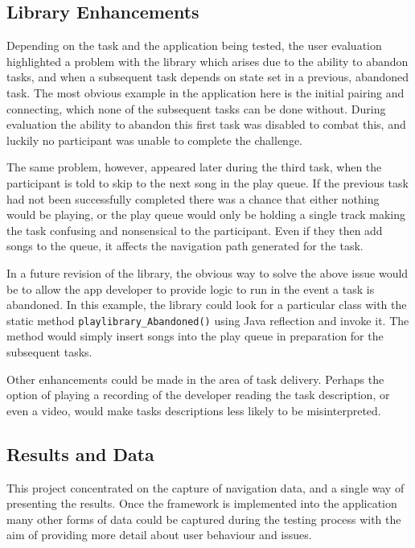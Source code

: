 
\subsection{Library Enhancements}

Depending on the task and the application being tested, the user 
evaluation highlighted a problem with the library which arises
due to the ability to abandon tasks, and when a subsequent task
depends on state set in a previous, abandoned task. The most 
obvious example in the application here is the initial pairing
and connecting, which none of the subsequent tasks can be done
without. During evaluation the ability to abandon this first task
was disabled to combat this, and luckily no participant was unable
to complete the challenge.

The same problem, however, appeared later during the third task, when
the participant is told to skip to the next song in the play queue.
If the previous task had not been successfully completed there was a
chance that either nothing would be playing, or the play queue would
only be holding a single track making the task confusing and nonsensical
to the participant. Even if they then add songs to the queue, it affects
the navigation path generated for the task.

In a future revision of the library, the obvious way to solve the above issue
would be to allow the app developer to provide logic to run in the event
a task is abandoned. In this example, the library could look for a
particular class with the static method \verb/playlibrary_Abandoned()/
using Java reflection and invoke it. The method would simply insert
songs into the play queue in preparation for the subsequent tasks.

Other enhancements could be made in the area of task delivery. Perhaps
the option of playing a recording of the developer reading the task
description, or even a video, would make tasks descriptions less likely
to be misinterpreted.

\subsection{Results and Data}

This project concentrated on the capture of navigation data, and a single
way of presenting the results. Once the framework is implemented into the
application many other forms of data could be captured during the testing
process with the aim of providing more detail about user behaviour and
issues.

